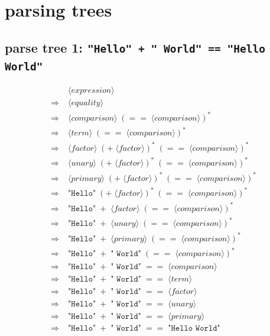 \documentclass[12pt]{article}
\begin{document}
\section*{parsing trees}


\subsection*{parse tree 1: \texttt{"Hello" + " World" == "Hello World"}}

\begin{align*}
&\langle\textit{expression}\rangle \\
\Rightarrow\;&\langle\textit{equality}\rangle \\
\Rightarrow\;&\langle\textit{comparison}\rangle\;(==\;\langle\textit{comparison}\rangle)^* \\
\Rightarrow\;&\langle\textit{term}\rangle\;(==\;\langle\textit{comparison}\rangle)^* \\
\Rightarrow\;&\langle\textit{factor}\rangle\;(+\;\langle\textit{factor}\rangle)^*\;(==\;\langle\textit{comparison}\rangle)^* \\
\Rightarrow\;&\langle\textit{unary}\rangle\;(+\;\langle\textit{factor}\rangle)^*\;(==\;\langle\textit{comparison}\rangle)^* \\
\Rightarrow\;&\langle\textit{primary}\rangle\;(+\;\langle\textit{factor}\rangle)^*\;(==\;\langle\textit{comparison}\rangle)^* \\
\Rightarrow\;&\texttt{"Hello"}\;(+\;\langle\textit{factor}\rangle)^*\;(==\;\langle\textit{comparison}\rangle)^* \\
\Rightarrow\;&\texttt{"Hello"}\;+\;\langle\textit{factor}\rangle\;(==\;\langle\textit{comparison}\rangle)^* \\
\Rightarrow\;&\texttt{"Hello"}\;+\;\langle\textit{unary}\rangle\;(==\;\langle\textit{comparison}\rangle)^* \\
\Rightarrow\;&\texttt{"Hello"}\;+\;\langle\textit{primary}\rangle\;(==\;\langle\textit{comparison}\rangle)^* \\
\Rightarrow\;&\texttt{"Hello"}\;+\;\texttt{" World"}\;(==\;\langle\textit{comparison}\rangle)^* \\
\Rightarrow\;&\texttt{"Hello"}\;+\;\texttt{" World"}\;==\;\langle\textit{comparison}\rangle \\
\Rightarrow\;&\texttt{"Hello"}\;+\;\texttt{" World"}\;==\;\langle\textit{term}\rangle \\
\Rightarrow\;&\texttt{"Hello"}\;+\;\texttt{" World"}\;==\;\langle\textit{factor}\rangle \\
\Rightarrow\;&\texttt{"Hello"}\;+\;\texttt{" World"}\;==\;\langle\textit{unary}\rangle \\
\Rightarrow\;&\texttt{"Hello"}\;+\;\texttt{" World"}\;==\;\langle\textit{primary}\rangle \\
\Rightarrow\;&\texttt{"Hello"}\;+\;\texttt{" World"}\;==\;\texttt{"Hello World"}
\end{align*}
\end{document}

